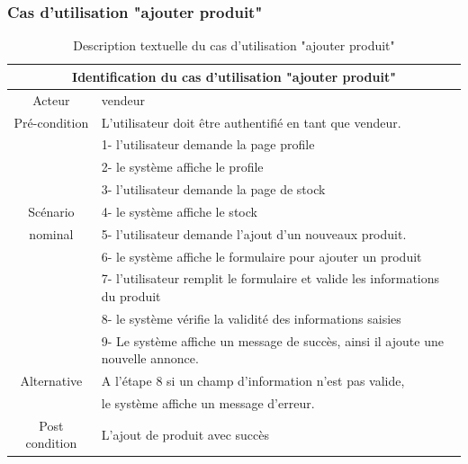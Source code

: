 \documentclass[edit,12pt,a4paper,ChapStyle,oneside,doubleinterligne]{report}
\begin{document}
\clearpage
\subsubsection{Cas d'utilisation "ajouter produit"}
\begin{table}[h!]
    \centering
    \begin{tabular}{|c|m{10cm}|}
    \hline
         \multicolumn{2}{|c|}{Identification du cas d'utilisation "ajouter produit" }\\
         \hline
         Acteur & vendeur\\
         \hline
         Pré-condition & L'utilisateur doit être authentifié en tant que vendeur. \\
         \hline
          & 1- l'utilisateur demande la page profile\\
          & 2- le système affiche le profile\\
          & 3- l'utilisateur demande la page de stock\\
          Scénario& 4- le système affiche le stock\\
          nominal& 5- l'utilisateur demande l’ajout d’un nouveaux produit.\\
          & 6- le système affiche le formulaire pour ajouter un produit \\
          & 7- l'utilisateur remplit le formulaire et valide les informations du produit \\
          & 8- le système vérifie la validité des informations saisies\\
          & 9- Le système affiche un message de succès, ainsi il ajoute une
          nouvelle annonce.\\
         \hline
         Alternative  & A l’étape 8 si un champ d’information n’est pas valide,  \\
         & le système affiche un message d’erreur.\\
         \hline
         Post condition& L’ajout de produit avec succès \\
         \hline
    \end{tabular}
    \caption{Description textuelle du cas d'utilisation "ajouter produit" }
    \label{tab:cas 5}
\end{table}
\end{document}
